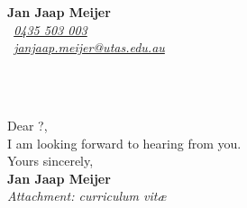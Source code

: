 \documentclass[11pt]{article}
\def\firstname{Jan Jaap}
\def\familyname{Meijer}
\def\FileAuthor{\firstname{ }\familyname}
\begin{document}
\sffamily   %
\hfill%
\begin{minipage}[t]{.6\textwidth}
\raggedleft%
{\bfseries \FileAuthor}\\[.35ex]
\small\itshape%
\Telefon~\href{tel:0061435503003}{0435 503 003}\\
\Letter~\href{mailto:janjaap.meijer@utas.edu.au}{janjaap.meijer@utas.edu.au}
\end{minipage}\\[1em]
%
\\[1em] %
\raggedright
Dear ?,\\[1.5em]
%

I am looking forward to hearing from you.\\[1.5em]

Yours sincerely,\\[3em] %
%
{\bfseries \FileAuthor}\\
%
\vfill%
{\slshape Attachment: curriculum vit\ae{}}
\end{document}
